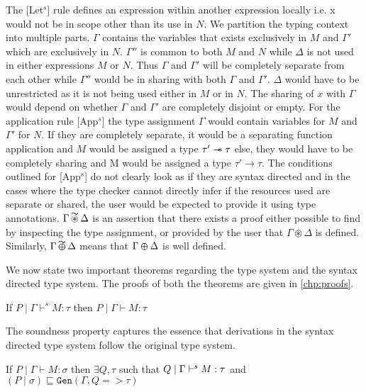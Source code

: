 The [Let$^s$] rule defines an expression within another expression locally i.e. x would
not be in scope other than its use in $N$. We partition the typing context into multiple parts.
$\Gamma$ contains the variables that exists exclusively in $M$ and $\Gamma'$ which
are exclusively in $N$. $\Gamma''$ is common to both $M$ and $N$ while $\Delta$ is not used in either expressions $M$ or $N$.
Thus $\Gamma$ and $\Gamma'$ will be completely separate from each other while $\Gamma''$ would be in sharing with both $\Gamma$ and $\Gamma'$.
$\Delta$ would have to be unrestricted as it is not being used either in $M$ or in $N$. The sharing of $x$ with $\Gamma$ would depend on
whether $\Gamma$ and $\Gamma'$ are completely disjoint or empty. For the application rule [App$^s$] the type assignment $\Gamma$ would contain
variables for $M$ and $\Gamma'$ for $N$. If they are completely separate, it would be a separating function application and $M$ would be
assigned a type $\tau' \mathrel{-\mkern-6mu*} \tau$ else, they would have to be completely sharing and M would be assigned a type $\tau' \rightarrow \tau$.
The conditions outlined for [App$^s$] do not clearly look as if they are syntax directed and in the cases where the type checker cannot directly infer if the
resources used are separate or shared, the user would be expected to provide it using type annotations. $\Gamma \tightoverset{\thicksim}{\circledast} \Delta$
is an assertion that there exists a proof either possible to find by inspecting the type assignment, or provided by the user
that $\Gamma \circledast \Delta$ is defined. Similarly, $\Gamma \tightoverset{\thicksim}{\varoplus} \Delta$ means that $\Gamma \varoplus \Delta$ is well
defined.

We now state two important theorems regarding the type system and the syntax directed type system. The proofs of both the
theorems are given in \cref{chp:proofs}.

\begin{theorem}
  If $P \mid \Gamma \vdash^s M:\tau$ then $P \mid \Gamma \vdash M : \tau$
\end{theorem}
The soundness property captures the essence that derivations in the syntax directed type system follow the original type system.

\begin{theorem}\label{thm:completeness-syntax-directed}
  If $P \mid \Gamma \vdash M:\sigma$ then
  $\exists Q, \tau$ such that $Q \mid \Gamma \vdash^s M:\tau$
  and $(P \mid \sigma) \sqsubseteq \texttt{Gen}(\Gamma, Q => \tau)$
\end{theorem}

